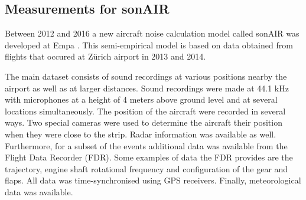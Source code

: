 %
%
%
%
%
%
%
%


\subsection{Measurements for sonAIR}\label{sec:introduction:sonair}
Between 2012 and 2016 a new aircraft noise calculation model called sonAIR was
developed at Empa \cite{Zellmann2013,Zellmann2016}. This semi-empirical model is
based on data obtained from flights that occured at Z\"{u}rich airport in 2013 and
2014.

The main dataset consists of sound recordings at various positions nearby the
airport as well as at larger distances. Sound recordings were made at 44.1 kHz with
microphones at a height of 4 meters above ground level and at several locations
simultaneously. The position of the aircraft were recorded in several ways. Two
special cameras were used to determine the aircraft their position when they
were close to the strip. Radar information was available as well. Furthermore,
for a subset of the events additional data was available from the Flight Data
Recorder (FDR). Some examples of data the FDR provides are the trajectory,
engine shaft rotational frequency and configuration of the gear and flaps. All
data was time-synchronised using GPS receivers. Finally, meteorological data was
available.

